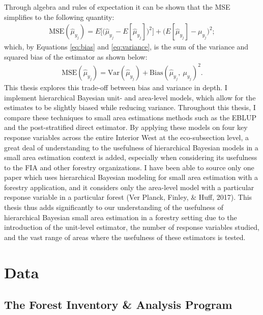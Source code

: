 \documentclass[12pt,twoside]{reedthesis}
\begin{document}
Through algebra and rules of expectation it can be shown that the MSE simplifies to the following quantity:
\begin{align}
\text{MSE}(\hat\mu_{y_j}) = E\Big[\Big(\hat\mu_{y_j} - E[\hat\mu_{y_j}]\Big)^2 \Big] + \Big(E[\hat\mu_{y_j}] - \mu_{y_j}\Big)^2;
\end{align}
which, by Equations \eqref{eq:bias} and \eqref{eq:variance}, is the sum of the variance and squared bias of the estimator as shown below:
\begin{align}
\text{MSE}(\hat\mu_{y_j}) = \text{Var}(\hat\mu_{y_j}) + \text{Bias}(\hat\mu_{y_j},~ \mu_{y_j})^2.
\end{align}
This thesis explores this trade-off between bias and variance in depth. I implement hierarchical Bayesian unit- and area-level models, which allow for the estimates to be slightly biased while reducing variance. Throughout this thesis, I compare these techniques to small area estimations methods such as the EBLUP and the post-stratified direct estimator. By applying these models on four key response variables across the entire Interior West at the eco-subsection level, a great deal of understanding to the usefulness of hierarchical Bayesian models in a small area estimation context is added, especially when considering its usefulness to the FIA and other forestry organizations. I have been able to source only one paper which uses hierarchical Bayesian modeling for small area estimation with a forestry application, and it considers only the area-level model with a particular response variable in a particular forest (Ver Planck, Finley, \& Huff, 2017). This thesis thus adds significantly to our understanding of the usefulness of hierarchical Bayesian small area estimation in a forestry setting due to the introduction of the unit-level estimator, the number of response variables studied, and the vast range of areas where the usefulness of these estimators is tested.

\hypertarget{data}{%
\chapter{Data}\label{data}}

\hypertarget{the-forest-inventory-analysis-program}{%
\section{The Forest Inventory \& Analysis Program}\label{the-forest-inventory-analysis-program}}
\end{document}
